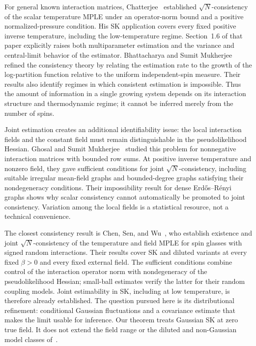 \documentclass[11pt]{amsart}
\numberwithin{equation}{section}
\theoremstyle{remark}
\begin{document}
For general known interaction matrices, Chatterjee~\cite[Theorem~1.1]{Chatterjee2007} established $\sqrt N$-consistency of the scalar temperature MPLE under an operator-norm bound and a positive normalized-pressure condition. His SK application covers every fixed positive inverse temperature, including the low-temperature regime. Section~1.6 of that paper explicitly raises both multiparameter estimation and the variance and central-limit behavior of the estimator. Bhattacharya and Sumit Mukherjee~\cite{BhattacharyaMukherjee2018} refined the consistency theory by relating the estimation rate to the growth of the log-partition function relative to the uniform independent-spin measure. Their results also identify regimes in which consistent estimation is impossible. Thus the amount of information in a single growing system depends on its interaction structure and thermodynamic regime; it cannot be inferred merely from the number of spins.

Joint estimation creates an additional identifiability issue: the local interaction fields and the constant field must remain distinguishable in the pseudolikelihood Hessian. Ghosal and Sumit Mukherjee~\cite{GhosalMukherjee2020} studied this problem for nonnegative interaction matrices with bounded row sums. At positive inverse temperature and nonzero field, they gave sufficient conditions for joint $\sqrt N$-consistency, including suitable irregular mean-field graphs and bounded-degree graphs satisfying their nondegeneracy conditions. Their impossibility result for dense Erd\H{o}s--R\'enyi graphs shows why scalar consistency cannot automatically be promoted to joint consistency. Variation among the local fields is a statistical resource, not a technical convenience.

The closest consistency result is Chen, Sen, and Wu~\cite{ChenSenWu2024}, who establish existence and joint $\sqrt N$-consistency of the temperature and field MPLE for spin glasses with signed random interactions. Their results cover SK and diluted variants at every fixed $\beta>0$ and every fixed external field. The sufficient conditions combine control of the interaction operator norm with nondegeneracy of the pseudolikelihood Hessian; small-ball estimates verify the latter for their random coupling models. Joint estimability in SK, including at low temperature, is therefore already established. The question pursued here is its distributional refinement: conditional Gaussian fluctuations and a covariance estimate that makes the limit usable for inference. Our theorem treats Gaussian SK at zero true field. It does not extend the field range or the diluted and non-Gaussian model classes of~\cite{ChenSenWu2024}.
\end{document}
